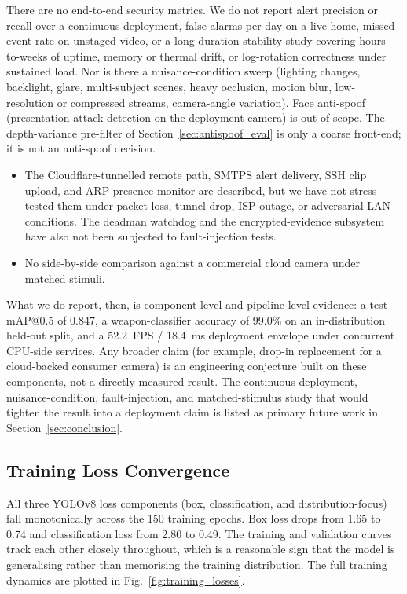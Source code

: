\documentclass{ieeeaccess}
\begin{document}
There are no end-to-end security metrics. We do not report alert precision or recall over a continuous deployment, false-alarms-per-day on a live home, missed-event rate on unstaged video, or a long-duration stability study covering hours-to-weeks of uptime, memory or thermal drift, or log-rotation correctness under sustained load. Nor is there a nuisance-condition sweep (lighting changes, backlight, glare, multi-subject scenes, heavy occlusion, motion blur, low-resolution or compressed streams, camera-angle variation). Face anti-spoof (presentation-attack detection on the deployment camera) is out of scope. The depth-variance pre-filter of Section~\ref{sec:antispoof_eval} is only a coarse front-end; it is not an anti-spoof decision.
\begin{itemize}
\item The Cloudflare-tunnelled remote path, SMTPS alert delivery, SSH clip upload, and ARP presence monitor are described, but we have not stress-tested them under packet loss, tunnel drop, ISP outage, or adversarial LAN conditions. The deadman watchdog and the encrypted-evidence subsystem have also not been subjected to fault-injection tests.
\item No side-by-side comparison against a commercial cloud camera under matched stimuli.
\end{itemize}
What we do report, then, is component-level and pipeline-level evidence: a test mAP{@}0.5 of 0.847, a weapon-classifier accuracy of 99.0\% on an in-distribution held-out split, and a 52.2~FPS / 18.4~ms deployment envelope under concurrent CPU-side services. Any broader claim (for example, drop-in replacement for a cloud-backed consumer camera) is an engineering conjecture built on these components, not a directly measured result. The continuous-deployment, nuisance-condition, fault-injection, and matched-stimulus study that would tighten the result into a deployment claim is listed as primary future work in Section~\ref{sec:conclusion}.

\subsection{Training Loss Convergence}
All three YOLOv8 loss components (box, classification, and distribution-focus) fall monotonically across the 150 training epochs. Box loss drops from 1.65 to 0.74 and classification loss from 2.80 to 0.49. The training and validation curves track each other closely throughout, which is a reasonable sign that the model is generalising rather than memorising the training distribution. The full training dynamics are plotted in Fig.~\ref{fig:training_losses}.
\end{document}
